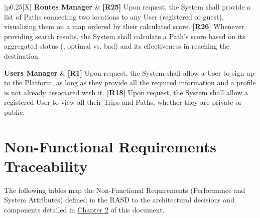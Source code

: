 {\begin{xltabular}{\textwidth}{|p{0.25\textwidth}|X|}
    \textbf{Routes Manager} & 
    \textbf{[R25]} Upon request, the System shall provide a list of Paths connecting two locations to any User (registered or guest), visualizing them on a map ordered by their calculated score. \newline
    \textbf{[R26]} Whenever providing search results, the System shall calculate a Path's score based on its aggregated status (\eg, optimal vs. bad) and its effectiveness in reaching the destination. \\
    \hline
    
    \textbf{Users Manager} & 
    \textbf{[R1]} Upon request, the System shall allow a User to sign up to the Platform, as long as they provide all the required information and a profile is not already associated with it. \newline
    \textbf{[R18]} Upon request, the System shall allow a registered User to view all their Trips and Paths, whether they are private or public. \\
    \hline

    \caption{Functional Requirements Traceability}
\end{xltabular}
}

\section{Non-Functional Requirements Traceability}
The following tables map the Non-Functional Requirements (Performance and System Attributes) defined in the RASD to the architectural decisions and components detailed in \hyperref[ch:architectural_design]{Chapter 2} of this document.

